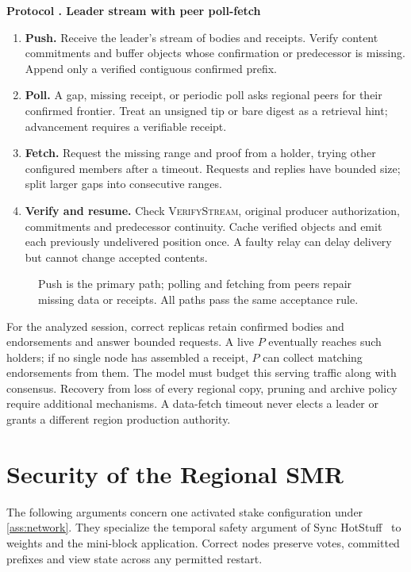 \documentclass[11pt,a4paper,onecolumn]{article}
\newcommand{\Proc}[1]{\textnormal{\textsc{#1}}}
\newcounter{protocol}
\newenvironment{protocol}[2]{\refstepcounter{protocol}\label{#1}
\begin{mdframed}[nobreak=true,linewidth=.6pt,skipabove=9pt,skipbelow=9pt,
innertopmargin=7pt,innerbottommargin=7pt]\small
\noindent\textbf{Protocol \theprotocol. #2}\par\smallskip}{\end{mdframed}}
\begin{document}
\begin{protocol}{alg:retrieval}{Leader stream with peer poll-fetch}
\begin{enumerate}[label=\textbf{D\arabic*.}]
\item \textbf{Push.} Receive the leader's stream of bodies and receipts.
Verify content commitments and buffer objects whose confirmation or predecessor
is missing. Append only a verified contiguous confirmed prefix.
\item \textbf{Poll.} A gap, missing receipt, or periodic poll asks regional
peers for their confirmed frontier. Treat an unsigned tip or bare digest as
a retrieval hint; advancement requires a verifiable receipt.
\item \textbf{Fetch.} Request the missing range and proof from a holder,
trying other configured members after a timeout. Requests and replies have
bounded size; split larger gaps into consecutive ranges.
\item \textbf{Verify and resume.} Check \Proc{VerifyStream}, original producer
authorization, commitments and predecessor continuity. Cache verified objects
and emit each previously undelivered position once. A faulty relay can delay
delivery but cannot change accepted contents.
\end{enumerate}
\end{protocol}

\begin{figure}[H]\centering

\caption{Push is the primary path; polling and fetching from peers repair
missing data or receipts. All paths pass the same acceptance rule.}
\label{fig:retrieval}
\end{figure}

For the analyzed session, correct replicas retain confirmed bodies and
endorsements and answer bounded requests. A live $P$ eventually reaches such
holders; if no single node has assembled a receipt, $P$ can collect matching
endorsements from them. The model must budget this serving traffic along with
consensus. Recovery from loss of every regional copy, pruning and archive
policy require additional mechanisms. A data-fetch timeout never elects a
leader or grants a different region production authority.

\section{Security of the Regional SMR}\label{sec:security}
The following arguments concern one activated stake configuration under
\cref{ass:network}. They specialize the temporal safety argument of
Sync HotStuff~\cite{synchotstuff} to weights and the mini-block application.
Correct nodes preserve votes, committed prefixes and view state across any
permitted restart.
\end{document}
